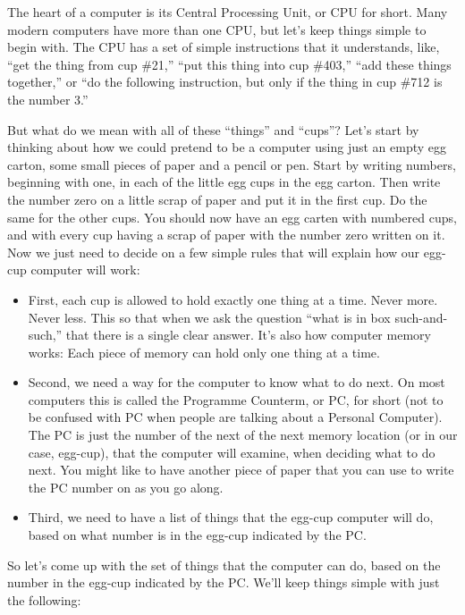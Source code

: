The heart of a computer is its Central Processing Unit, or CPU for short.  Many modern computers have more than one CPU, but let's keep
things simple to begin with.  The CPU has a set of simple instructions that it understands, like, ``get the thing from cup \#21,'' ``put this thing into cup \#403,'' ``add these things together,'' or ``do the following instruction, but only if the thing in cup \#712 is the number 3.''

But what do we mean with all of these ``things'' and ``cups''? Let's start by thinking about how we could pretend to be a computer using
just an empty egg carton, some small pieces of paper and a pencil or pen.  Start by writing numbers, beginning with one, in each of the
little egg cups in the egg carton.  Then write the number zero on a little scrap of paper and put it in the first cup.  Do the same for the other cups. You should now have an egg carten with numbered cups, and with every cup having a scrap of paper with the number zero written on it. Now we just need to decide on a few simple rules that will explain how our egg-cup computer will work:

\begin{itemize}
  \item First, each cup is allowed to hold exactly one thing at a time. Never more. Never less.  This so that when we ask the question ``what is in box such-and-such,'' that there is a single clear answer. It's also how computer memory works: Each piece of memory can hold only one thing at a time.

  \item Second, we need a way for the computer to know what to do next. On most computers this is called the Programme Counterm, or PC, for short (not to be confused with PC when people are talking about a Personal Computer).  The PC is just the number of the next of the next memory location (or in our case, egg-cup), that the computer will examine, when deciding what to do next.  You might like to have another piece of paper that you can use to write the PC number on as you go along.

  \item Third, we need to have a list of things that the egg-cup computer will do, based on what number is in the egg-cup indicated by the 
    PC.
\end{itemize}

So let's come up with the set of things that the computer can do, based on the number in the egg-cup indicated by the PC.  We'll keep things simple with just the following:

